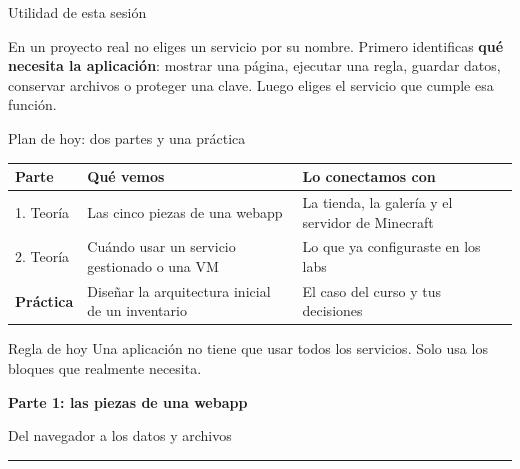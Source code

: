 \documentclass[aspectratio=169,10pt,c]{beamer}
\newcommand{\separador}[2]{%
\begin{frame}[plain]
\vfill
\begin{center}
{\fontsize{29}{34}\selectfont\bfseries #1}\par
\vspace{2mm}
{\small #2}\par
\vspace{4mm}
{\color{utpRojo}\rule{8.5cm}{1.2pt}}
\end{center}
\vfill
\end{frame}}
\begin{document}
\begin{frame}[c]{Utilidad de esta sesión}
\begin{center}
\begin{minipage}{.84\textwidth}
{\large En un proyecto real no eliges un servicio por su nombre. Primero identificas \textbf{qué necesita la aplicación}: mostrar una página, ejecutar una regla, guardar datos, conservar archivos o proteger una clave. Luego eliges el servicio que cumple esa función.}
\end{minipage}
\end{center}
\end{frame}

\begin{frame}{Plan de hoy: dos partes y una práctica}
\renewcommand{\arraystretch}{1.35}
\centering\small
\begin{tabular}{@{}p{1.55cm}>{\raggedright\arraybackslash}p{5.8cm}>{\raggedright\arraybackslash}p{5.45cm}@{}}
\toprule
\textbf{Parte} & \textbf{Qué vemos} & \textbf{Lo conectamos con}\\
\midrule
1. Teoría & Las cinco piezas de una webapp & La tienda, la galería y el servidor de Minecraft\\
2. Teoría & Cuándo usar un servicio gestionado o una VM & Lo que ya configuraste en los labs\\
\textbf{Práctica} & Diseñar la arquitectura inicial de un inventario & El caso del curso y tus decisiones\\
\bottomrule
\end{tabular}
\par\vspace{3mm}
\begin{alertblock}{Regla de hoy}
\small Una aplicación no tiene que usar todos los servicios. Solo usa los bloques que realmente necesita.
\end{alertblock}
\end{frame}

\separador{Parte 1: las piezas de una webapp}{Del navegador a los datos y archivos}
\end{document}
